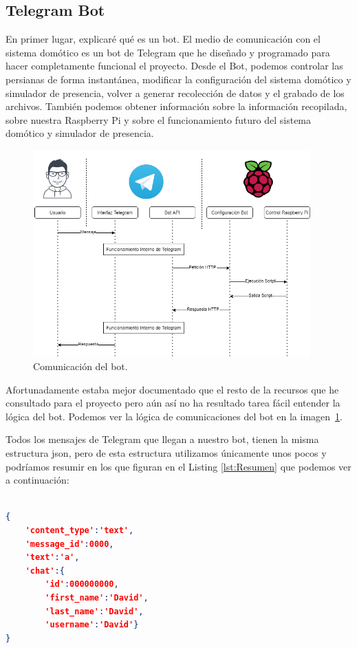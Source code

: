 \subsection{Telegram Bot}\label{5.TelegramBot}
En primer lugar, explicaré qué es un bot. El medio de comunicación con el sistema domótico es un bot de Telegram que he diseñado y programado para hacer completamente funcional el proyecto. Desde el Bot, podemos controlar las persianas de forma instantánea, modificar la configuración del sistema domótico y simulador de presencia, volver a generar recolección de datos y el grabado de los archivos. También podemos obtener información sobre la información recopilada, sobre nuestra Raspberry Pi y sobre el funcionamiento futuro del sistema domótico y simulador de presencia.

\begin{figure}
    \centering
    \includegraphics[width=0.95\textwidth]{img/Diagramas/FuncionamientoBot.png}
    \caption{Comunicación del bot. } \label{Img:FuncionamientoBot}
\end{figure}


Afortunadamente estaba mejor documentado que el resto de la recursos que he consultado para el proyecto pero aún así no ha resultado tarea fácil entender la lógica del bot. 
Podemos ver la lógica de comunicaciones del bot en la imagen~\ref{Img:FuncionamientoBot}. 

Todos los mensajes de Telegram que llegan a nuestro bot, tienen la misma estructura json, pero de esta estructura utilizamos únicamente unos pocos y podríamos resumir en los que figuran en el  Listing \ref{lst:Resumen} que podemos ver a continuación:~\\~\\
\begin{lstlisting}[language=json,firstnumber=0, basicstyle=\small, caption={Resumen de los datos que utilizamos del mensaje de Telegram.},label={lst:Resumen}]
{
    'content_type':'text',
    'message_id':0000,
    'text':'a',
    'chat':{
        'id':000000000,
        'first_name':'David',
        'last_name':'David',
        'username':'David'}
}
\end{lstlisting}

